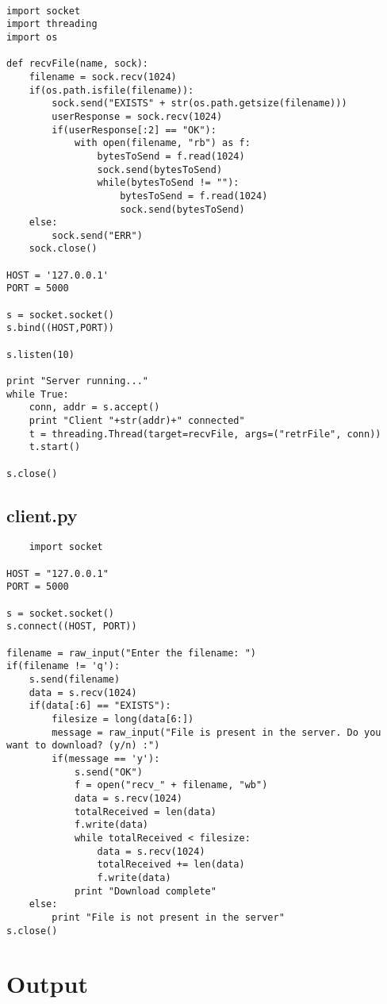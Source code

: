 \documentclass[a4paper,12pt]{article}
\begin{document}
\begin{verbatim}

import socket
import threading
import os

def recvFile(name, sock):
    filename = sock.recv(1024)
    if(os.path.isfile(filename)):
        sock.send("EXISTS" + str(os.path.getsize(filename)))
        userResponse = sock.recv(1024)
        if(userResponse[:2] == "OK"):
            with open(filename, "rb") as f:
                bytesToSend = f.read(1024)
                sock.send(bytesToSend)
                while(bytesToSend != ""):
                    bytesToSend = f.read(1024)
                    sock.send(bytesToSend)
    else:
        sock.send("ERR")
    sock.close()

HOST = '127.0.0.1'
PORT = 5000

s = socket.socket()
s.bind((HOST,PORT))

s.listen(10)

print "Server running..."
while True:
    conn, addr = s.accept()
    print "Client "+str(addr)+" connected"
    t = threading.Thread(target=recvFile, args=("retrFile", conn))
    t.start()

s.close()

\end{verbatim}

\subsection{client.py}
\begin{verbatim}
    import socket

HOST = "127.0.0.1"
PORT = 5000

s = socket.socket()
s.connect((HOST, PORT))

filename = raw_input("Enter the filename: ")
if(filename != 'q'):
    s.send(filename)
    data = s.recv(1024)
    if(data[:6] == "EXISTS"):
        filesize = long(data[6:])
        message = raw_input("File is present in the server. Do you want to download? (y/n) :")  
        if(message == 'y'):
            s.send("OK")
            f = open("recv_" + filename, "wb")
            data = s.recv(1024)
            totalReceived = len(data)
            f.write(data)
            while totalReceived < filesize:
                data = s.recv(1024)
                totalReceived += len(data)
                f.write(data)
            print "Download complete"
    else:
        print "File is not present in the server"
s.close()

\end{verbatim}
\section{Output}
\end{document}
